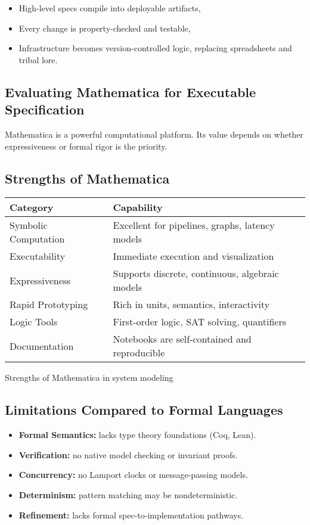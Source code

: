 \begin{itemize}
  \item High-level specs compile into deployable artifacts,
  \item Every change is property-checked and testable,
  \item Infrastructure becomes version-controlled logic, replacing spreadsheets and tribal lore.
\end{itemize}

\subsection*{Evaluating Mathematica for Executable Specification}

Mathematica is a powerful computational platform. Its value depends on whether expressiveness or formal rigor is the priority.

\subsection{Strengths of Mathematica}

\begin{marginfigure}[+80mm]
\scriptsize
\begin{tabularx}{\linewidth}{@{}lX@{}}
\toprule
\textbf{Category} & \textbf{Capability} \\
\midrule
Symbolic Computation & Excellent for pipelines, graphs, latency models \\
Executability & Immediate execution and visualization \\
Expressiveness & Supports discrete, continuous, algebraic models \\
Rapid Prototyping & Rich in units, semantics, interactivity \\
Logic Tools & First-order logic, SAT solving, quantifiers \\
Documentation & Notebooks are self-contained and reproducible \\
\bottomrule
\end{tabularx}
\caption{Strengths of Mathematica in system modeling}
\end{marginfigure}

\subsection*{Limitations Compared to Formal Languages}

\begin{itemize}
  \item \textbf{Formal Semantics:} lacks type theory foundations (Coq, Lean).
  \item \textbf{Verification:} no native model checking or invariant proofs.
  \item \textbf{Concurrency:} no Lamport clocks or message-passing models.
  \item \textbf{Determinism:} pattern matching may be nondeterministic.
  \item \textbf{Refinement:} lacks formal spec-to-implementation pathways.
\end{itemize}

